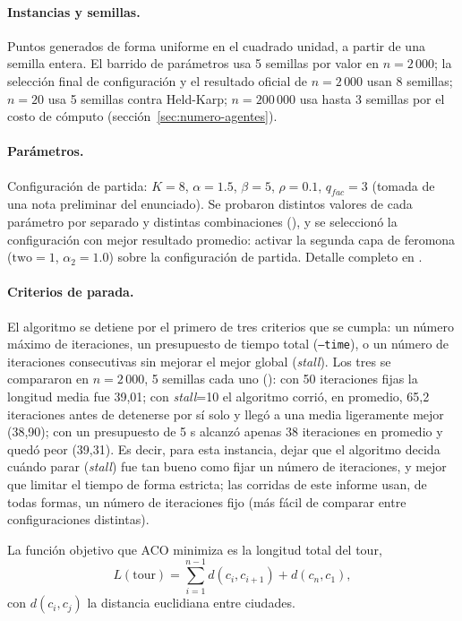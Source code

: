 \documentclass[12pt,a4paper]{article}
\begin{document}
\paragraph{Instancias y semillas.} Puntos generados de forma uniforme en el
cuadrado unidad, a partir de una semilla entera. El barrido de parámetros usa 5 semillas
por valor en $n=2\,000$; la selección final de configuración y el resultado
oficial de $n=2\,000$ usan 8 semillas; $n=20$ usa 5 semillas contra
Held-Karp; $n=200\,000$ usa hasta 3 semillas por el costo de cómputo
(sección~\ref{sec:numero-agentes}).

\paragraph{Parámetros.} Configuración de partida: $K=8$, $\alpha=1.5$,
$\beta=5$, $\rho=0.1$, $q_{fac}=3$ (tomada de una nota preliminar del
enunciado). Se probaron distintos valores de cada parámetro por separado y
distintas combinaciones
(\texttt{}), y se seleccionó
la configuración con mejor resultado promedio: activar la segunda capa de
feromona ($\text{two}=1$, $\alpha_2=1.0$) sobre la configuración de
partida. Detalle completo en \texttt{}.

\paragraph{Criterios de parada.} El algoritmo se detiene por el primero de
tres criterios que se cumpla: un número máximo de iteraciones, un
presupuesto de tiempo total (\texttt{--time}), o un número de iteraciones
consecutivas sin mejorar el mejor global (\emph{stall}). Los tres se
compararon en $n=2\,000$, 5 semillas cada uno
(\texttt{}): con 50 iteraciones fijas
la longitud media fue 39,01; con \emph{stall}=10 el algoritmo corrió, en
promedio, 65,2 iteraciones antes de detenerse por sí solo y llegó a una
media ligeramente mejor (38,90); con un presupuesto de 5 s alcanzó apenas 38
iteraciones en promedio y quedó peor (39,31). Es decir, para esta
instancia, dejar que el algoritmo decida cuándo parar (\emph{stall}) fue
tan bueno como fijar un número de iteraciones, y mejor que limitar el
tiempo de forma estricta; las corridas de este informe usan, de todas
formas, un número de iteraciones fijo (más fácil de comparar entre
configuraciones distintas).

La función objetivo que ACO minimiza es la longitud total del tour,
\begin{equation}
L(\text{tour}) = \sum_{i=1}^{n-1} d(c_i, c_{i+1}) + d(c_n, c_1),
\label{eq:objetivo}
\end{equation}
con $d(c_i,c_j)$ la distancia euclidiana entre ciudades.
\end{document}
